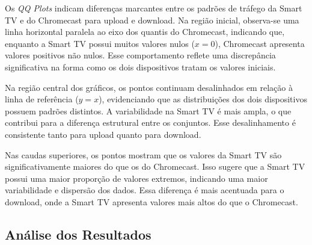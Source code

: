 Os \textit{QQ Plots} indicam diferenças marcantes entre os padrões de tráfego da Smart TV e do Chromecast para upload e download. Na região inicial, observa-se uma linha horizontal paralela ao eixo dos quantis do Chromecast, indicando que, enquanto a Smart TV possui muitos valores nulos (\(x = 0\)), Chromecast apresenta valores positivos não nulos. Esse comportamento reflete uma discrepância significativa na forma como os dois dispositivos tratam os valores iniciais.

Na região central dos gráficos, os pontos continuam desalinhados em relação à linha de referência (\(y = x\)), evidenciando que as distribuições dos dois dispositivos possuem padrões distintos. A variabilidade na Smart TV é mais ampla, o que contribui para a diferença estrutural entre os conjuntos. Esse desalinhamento é consistente tanto para upload quanto para download.

Nas caudas superiores, os pontos mostram que os valores da Smart TV são significativamente maiores do que os do Chromecast. Isso sugere que a Smart TV possui uma maior proporção de valores extremos, indicando uma maior variabilidade e dispersão dos dados. Essa diferença é mais acentuada para o download, onde a Smart TV apresenta valores mais altos do que o Chromecast.

\subsection{Análise dos Resultados}

